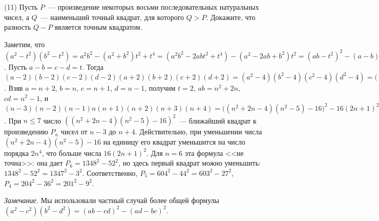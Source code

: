 \textsf{(11)}
Пусть $P$~--- произведение некоторых восьми последовательных натуральных чисел,
а $Q$~--- наименьший точный квадрат, для которого $Q > P$.
Докажите, что разность $Q - P$ является точным квадратом.

\solution
Заметим, что
\(
    (a^2 - t^2) (b^2 - t^2)
=
    a^2 b^2 - (a^2 + b^2) t^2 + t^4
=
    (a^2 b^2 - 2 a b t^2 + t^4) - (a^2 - 2 a b + b^2) t^2
=
    (a b - t^2)^2 - (a - b)^2 t^2
\).
Пусть $a - b = c - d = t$.
Тогда
\(
    (a - 2) (b - 2) (c - 2) (d - 2) (a + 2) (b + 2) (c + 2) (d + 2)
=
    (a^2 - 4)(b^2 - 4)(c^2 - 4)(d^2 - 4)
=
    \bigl(
        (a b - 4)^2 - 4 t^2
    \bigr)
    \bigl(
        (c d - 4)^2 - 4 t^2
    \bigr)
=
    \bigl(
        (a b - 4) (c d - 4) - 4 t^2
    \bigr)^2
    -
    4 (a b - c d)^2 t^2
\).
Взяв $a = n + 2$, $b = n$, $c = n + 1$, $d = n - 1$,
получим $t = 2$, $a b = n^2 + 2 n$, $c d = n^2 - 1$, и
\(
    (n - 3) (n - 2) (n - 1) n (n + 1) (n + 2) (n + 3) (n + 4)
=
    \bigl(
        (n^2 + 2 n - 4) (n^2 - 5) - 16
    \bigr)^2
    -
    16 (2 n + 1)^2
\).
При $n \leq 7$ число $((n^2 + 2 n - 4) (n^2 - 5) - 16)^2$~--- ближайший квадрат
к произведению $P_n$ чисел от $n - 3$ до $n + 4$.
Действительно, при уменьшении числа $(n^2 + 2 n - 4) (n^2 - 5) - 16$ на единицу
его квадрат уменьшится на число порядка $2 n^4$,
что больше числа $16 (2 n + 1)^2$.
Для $n = 6$ эта формула <<не точна>>:
она дает $P_6 = 1348^2 - 52^2$, но здесь первый квадрат можно уменьшить:
$1348^2 - 52^2 = 1347^2 - 3^2$.
Соответственно,
$P_5 = 604^2 - 44^2 = 603^2 - 27^2$,
$P_4 = 204^2 - 36^2 = 201^2 - 9^2$.
\par
\emph{Замечание.}
Мы использовали частный случай более общей формулы
$(a^2 - c^2) (b^2 - d^2) = (a b - c d)^2 - (a d - b c)^2$.

